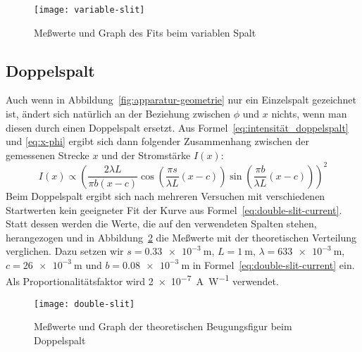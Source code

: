 \begin{figure}
  \centering
  \texttt{[image: variable-slit]}
  \caption{Meßwerte und Graph des Fits beim variablen Spalt}
  \label{fig:variable-slit}
\end{figure}

\subsection{Doppelspalt}

Auch wenn in Abbildung~\ref{fig:apparatur-geometrie} nur ein Einzelspalt
gezeichnet ist, ändert sich natürlich an der Beziehung zwischen $\phi$
und $x$ nichts, wenn man diesen durch einen Doppelspalt ersetzt. Aus
Formel~\eqref{eq:intensität_doppelspalt} und \eqref{eq:x-phi} ergibt
sich dann folgender Zusammenhang zwischen der gemessenen Strecke $x$ und
der Stromstärke $I(x)$:
%
\begin{equation}
  \label{eq:double-slit-current}
  I(x) \propto \left( \frac{2\lambda L}{\pi b(x-c)}
    \cos\left(\frac{\pi s}{\lambda L} (x-c)\right)
    \sin\left(\frac{\pi b}{\lambda L} (x-c)\right) \right)^2
\end{equation}
Beim Doppelspalt ergibt sich nach mehreren Versuchen mit verschiedenen
Startwerten kein geeigneter Fit der Kurve aus
Formel~\eqref{eq:double-slit-current}. Statt dessen werden die Werte,
die auf den verwendeten Spalten stehen, herangezogen und in
Abbildung~\ref{fig:double-slit} die Meßwerte mit der theoretischen
Verteilung verglichen. Dazu setzen wir $s = \SI{0.33e-3}{\metre}$, $L =
\SI{1}{\metre}$, $\lambda = \SI{633e-3}{\metre}$, $c =
\SI{26e-3}{\metre}$ und $b = \SI{0.08e-3}{\metre}$ in
Formel~\eqref{eq:double-slit-current} ein. Als Proportionalitätsfaktor
wird \SI[exponent-to-prefix = false,
per-mode=symbol]{2e-7}{\ampere\per\watt} verwendet.

\begin{figure}
  \centering
  \texttt{[image: double-slit]}
  \caption{Meßwerte und Graph der theoretischen Beugungsfigur beim Doppelspalt}
  \label{fig:double-slit}
\end{figure}
